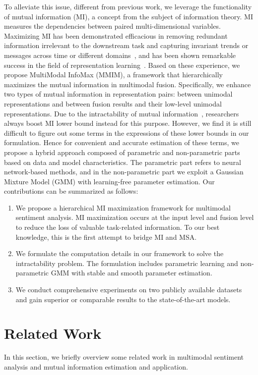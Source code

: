 \documentclass[11pt]{article}
\newcommand{\modelname}{MMIM}
\begin{document}
To alleviate this issue, different from previous work, we leverage the functionality of mutual information (MI), a concept from the subject of information theory.
MI measures the dependencies between paired multi-dimensional variables.
Maximizing MI has been demonstrated efficacious in removing redundant information irrelevant
to the downstream task and capturing invariant trends or messages across time or different domains~\citep{poole2019variational}, and has been shown remarkable success in the field of representation learning~\cite{hjelm2018learning,velivckovic2018deep}. 
Based on these experience, we propose MultiModal InfoMax (\modelname), a framework that hierarchically maximizes the mutual information in multimodal fusion.
Specifically, we enhance two types of mutual information in representation pairs: between unimodal representations and between fusion results and their low-level unimodal representations.
Due to the intractability of mutual information~\citep{belghazi2018mutual}, researchers always boost MI lower bound instead for this purpose.
However, we find it is still difficult to figure out some terms in the expressions of these lower bounds in our formulation.
Hence for convenient and accurate estimation of these terms, we propose a hybrid approach composed of parametric and non-parametric parts based on data and model characteristics. 
The parametric part refers to neural network-based methods, and in the non-parametric part we exploit a Gaussian Mixture Model (GMM) with learning-free parameter estimation.
Our contributions can be summarized as follows:
\begin{enumerate}
    \item We propose a hierarchical MI maximization framework for multimodal sentiment analysis. MI maximization occurs at the input level and fusion level to reduce the loss of valuable task-related information. 
    To our best knowledge, this is the first attempt to bridge MI and MSA.
    \item We formulate the computation details in our framework to solve the intractability problem. 
    The formulation includes parametric learning and non-parametric GMM with stable and smooth parameter estimation.
    \item We conduct comprehensive experiments on two publicly available datasets and gain superior or comparable results to the state-of-the-art models.
\end{enumerate}

%
 \section{Related Work}
In this section, we briefly overview some related work in multimodal sentiment analysis and mutual information estimation and application.
\end{document}
